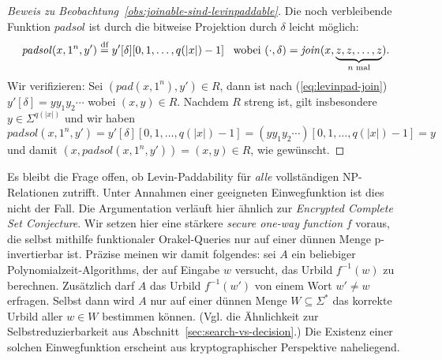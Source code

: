 \begin{proof}[Beweis zu Beobachtung~\ref{obs:joinable-sind-levinpaddable}]
    Die noch verbleibende Funktion $\mathit{padsol}$ ist durch die bitweise Projektion durch $\delta$ leicht möglich:
    \[
    \mathit{padsol}(x, 1^n, y') \stackrel{\text{df}}{=}  y'[\delta][0, 1, \ldots, q(|x|)-1] \enspace\text{ wobei } (\cdot, \delta) = \mathit{join}(x, \underbrace{z,z,\ldots, z}_{\text{$n$ mal}}).\]
    Wir verifizieren: Sei $(\mathit{pad}(x, 1^n), y')\in R$, dann ist nach (\ref{eq:levinpad-join}) $y'[\delta]=yy_1y_2\cdots$ wobei $(x,y)\in R$. Nachdem $R$ streng ist, gilt insbesondere $y\in\Sigma^{q(|x|)}$ und wir haben
\[ \mathit{padsol}(x, 1^n, y') = y'[\delta][0, 1, \ldots, q(|x|)-1] = (yy_1y_2\cdots)[0,1,\ldots,q(|x|)-1] = y \]
    und damit $(x, \mathit{padsol}(x, 1^n, y')) = (x, y)\in R$, wie gewünscht.
\end{proof}

Es bleibt die Frage offen, ob Levin-Paddability für \emph{alle} vollständigen NP-Relationen zutrifft. Unter Annahmen einer geeigneten Einwegfunktion ist dies nicht der Fall.
Die Argumentation verläuft hier ähnlich zur \emph{Encrypted Complete Set Conjecture}.
Wir setzen hier eine stärkere \emph{secure one-way function} \parencite{grollmann_complexity_1988} $f$ voraus, die selbst mithilfe funktionaler Orakel-Queries nur auf einer dünnen Menge p-invertierbar ist.
Präzise meinen wir damit folgendes: sei $A$ ein beliebiger Polynomialzeit-Algorithms, der auf Eingabe $w$ versucht, das Urbild $f^{-1}(w)$ zu berechnen. Zusätzlich darf $A$ das Urbild $f^{-1}(w')$ von einem Wort $w'\neq w$ erfragen. Selbst dann wird $A$ nur auf einer dünnen Menge $W\subseteq\Sigma^*$ das korrekte Urbild aller $w\in W$ bestimmen können.
(Vgl. die Ähnlichkeit zur Selbstreduzierbarkeit aus Abschnitt~\ref{sec:search-vs-decision}.)
Die Existenz einer solchen Einwegfunktion erscheint aus kryptographischer Perspektive naheliegend.

